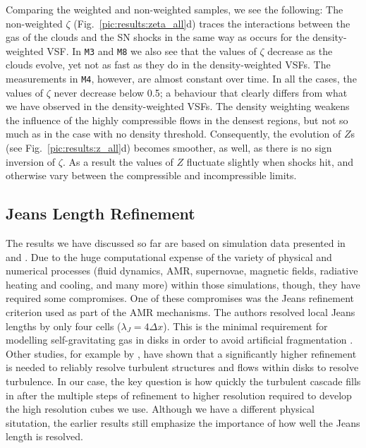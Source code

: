 Comparing the weighted and non-weighted samples, we see the following:
The non-weighted $\zeta$ (Fig.~\ref{pic:results:zeta_all}d) traces the interactions between the gas of the clouds and the SN shocks in the same way as occurs for the density-weighted VSF.
In \texttt{M3} and \texttt{M8} we also see that the values of $\zeta$ decrease as the clouds evolve, yet not as fast as they do in the density-weighted VSFs. 
The measurements in \texttt{M4}, however, are almost constant over time. 
In all the cases, the values of $\zeta$ never decrease below 0.5; a behaviour that clearly differs from what we have observed in the density-weighted VSFs. 
The density weighting weakens the influence of the highly compressible flows in the densest regions, but not so much as in the case with no density threshold. 
Consequently, the evolution of $Z$s (see Fig.~\ref{pic:results:z_all}d) becomes smoother, as well, as there is no sign inversion of $\zeta$.
As a result the values of $Z$ fluctuate slightly when shocks hit, and otherwise vary between the compressible and incompressible limits.



\subsection{Jeans Length Refinement}\label{results:refinement}

The results we have discussed so far are based on simulation data presented in  and .
Due to the huge computational expense of the variety of physical and numerical processes (fluid dynamics, AMR, supernovae, magnetic fields, radiative heating and cooling, and many more) within those simulations, though, they have required some compromises.
One of these compromises was the Jeans refinement criterion used as part of the AMR mechanisms.
The authors resolved local Jeans lengths by only four cells ($\lambda_J=4\Delta{}x$).
This is the minimal requirement for modelling self-gravitating gas in disks in order to avoid artificial fragmentation \citep{Truelove1998}. 
Other studies, for example by \citet{Turk2012}, have shown that a significantly higher refinement is needed to reliably resolve turbulent structures and flows within disks to resolve turbulence.  In our case, the key question is how quickly the turbulent cascade fills in after the multiple steps of refinement to higher resolution required to develop the high resolution cubes we use.  
Although we have a different physical situtation, the earlier results still emphasize the importance of how well the Jeans length is resolved.

